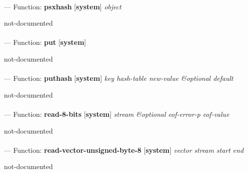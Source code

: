 \paragraph{}
\label{SYSTEM:PSXHASH}
--- Function: \textbf{psxhash} [\textbf{system}] \textit{object}

\begin{adjustwidth}{5em}{5em}
not-documented
\end{adjustwidth}

\paragraph{}
\label{SYSTEM:PUT}
--- Function: \textbf{put} [\textbf{system}] \textit{}

\begin{adjustwidth}{5em}{5em}
not-documented
\end{adjustwidth}

\paragraph{}
\label{SYSTEM:PUTHASH}
--- Function: \textbf{puthash} [\textbf{system}] \textit{key hash-table new-value \&optional default}

\begin{adjustwidth}{5em}{5em}
not-documented
\end{adjustwidth}

\paragraph{}
\label{SYSTEM:READ-8-BITS}
--- Function: \textbf{read-8-bits} [\textbf{system}] \textit{stream \&optional eof-error-p eof-value}

\begin{adjustwidth}{5em}{5em}
not-documented
\end{adjustwidth}

\paragraph{}
\label{SYSTEM:READ-VECTOR-UNSIGNED-BYTE-8}
--- Function: \textbf{read-vector-unsigned-byte-8} [\textbf{system}] \textit{vector stream start end}

\begin{adjustwidth}{5em}{5em}
not-documented
\end{adjustwidth}

